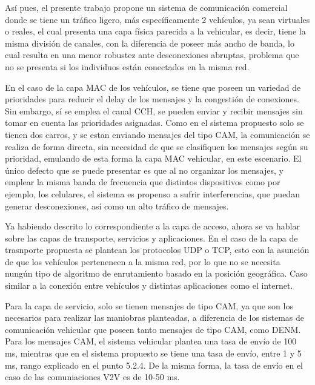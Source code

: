 \par Así pues, el presente trabajo propone un sistema de comunicación comercial donde se tiene un tráfico ligero, más específicamente 2 vehículos, ya sean virtuales o reales, el cual presenta una capa física parecida a la vehicular, es decir, tiene la misma división de canales, con la diferencia de poseer más ancho de banda, lo cual resulta en una menor robustez ante desconexiones abruptas, problema que no se presenta si los individuos están conectados en la misma red.\\
\par En el caso de la capa MAC de los vehículos, se tiene que poseen un variedad de prioridades para reducir el delay de los mensajes y la congestión de conexiones. Sin embargo, sí se emplea el canal CCH, se pueden enviar y recibir mensajes sin tomar en cuenta las prioridades asignadas. Como en el sistema propuesto solo se tienen dos carros, y se estan enviando mensajes del tipo CAM, la comunicación se realiza de forma directa, sin necesidad de que se clasifiquen los mensajes según su prioridad, emulando de esta forma la capa MAC vehicular, en este escenario. El único defecto que se puede presentar es que al no organizar los mensajes, y emplear la misma banda de frecuencia que distintos dispositivos como por ejemplo, los celulares, el sistema es propenso a sufrir interferencias, que puedan generar desconexiones, así como un alto tráfico de mensajes.\\

\par Ya habiendo descrito lo correspondiente a la capa de acceso, ahora se va hablar sobre las capas de transporte, servicios y aplicaciones. En el caso de la capa de trasnporte propuesta se plantean los protocolos UDP o TCP, esto con la asunción de que los vehículos pertenencen a la misma red, por lo que no se necesita nungún tipo de algoritmo de enrutamiento basado en la posición geográfica. Caso similar a la conexión entre vehículos y distintas aplicaciones como el internet.\\

\par Para la capa de servicio, solo se tienen mensajes de tipo CAM, ya que son los necesarios para realizar las maniobras planteadas, a diferencia de los sistemas de comunicación vehicular que poseen tanto mensajes de tipo CAM, como DENM. Para los mensajes CAM, el sistema vehicular plantea una tasa de envío de 100 ms, mientras que en el sistema propuesto se tiene una tasa de envío, entre 1 y 5 ms, rango explicado en el punto 5.2.4. De la misma forma, la tasa de envío en el caso de las comuniaciones V2V es de 10-50 ms.\\


